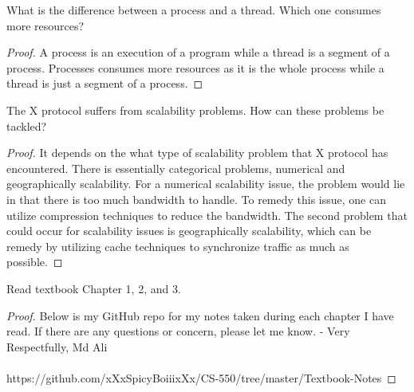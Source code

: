 \documentclass[12pt]{article}
\newenvironment{exercise}[2][Exercise]{\begin{trivlist}
\item[\hskip \labelsep {\bfseries #1}\hskip \labelsep {\bfseries #2.}]}{\end{trivlist}}
\begin{document}
\begin{exercise}{10}
What is the difference between a process and a thread. Which one consumes more resources?
\end{exercise}

\begin{proof}
A process is an execution of a program while a thread is a segment of a process. Processes consumes more resources as it is the whole process while a thread is just a segment of a process. 
\end{proof}

\begin{exercise}{11}
The X protocol suffers from scalability problems. How can these problems be tackled?
\end{exercise}

\begin{proof}
It depends on the what type of scalability problem that X protocol has encountered. There is essentially categorical problems, numerical and geographically scalability. For a numerical scalability issue, the problem would lie in that there is too much bandwidth to handle. To remedy this issue, one can utilize compression techniques to reduce the bandwidth. The second problem that could occur for scalability issues is geographically scalability, which can be remedy by utilizing cache techniques to synchronize traffic as much as possible. 
\end{proof}

\begin{exercise}{12}
Read textbook Chapter 1, 2, and 3.
\end{exercise}

\begin{proof}
Below is my GitHub repo for my notes taken during each chapter I have read. If there are any questions or concern, please let me know. - Very Respectfully, Md Ali \\ \\
https://github.com/xXxSpicyBoiiixXx/CS-550/tree/master/Textbook-Notes
\end{proof}
 
\end{document}
